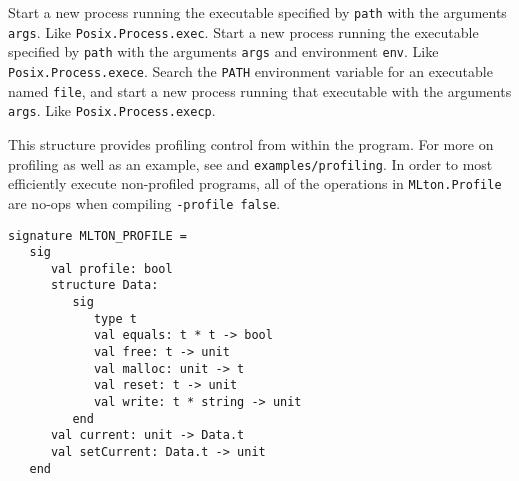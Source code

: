\begin{description}
Start a new process running the executable specified by {\tt path} with the
arguments {\tt args}.  Like {\tt Posix.Process.exec}.
Start a new process running the executable specified by {\tt path} with the
arguments {\tt args} and environment {\tt env}.  Like {\tt Posix.Process.exece}.
Search the {\tt PATH} environment variable for an executable named {\tt file},
and start a new process running that executable with the arguments {\tt args}.
Like {\tt Posix.Process.execp}.
\end{description}

This structure provides profiling control from within the program.
For more on profiling as well as an example, see 
and {\tt examples/profiling}. In order to most efficiently execute
non-profiled programs, all of the operations in {\tt MLton.Profile}
are no-ops when compiling {\tt -profile false}.

\begin{verbatim}
signature MLTON_PROFILE =
   sig
      val profile: bool
      structure Data:
         sig
            type t
            val equals: t * t -> bool
            val free: t -> unit
            val malloc: unit -> t
            val reset: t -> unit
            val write: t * string -> unit
         end
      val current: unit -> Data.t
      val setCurrent: Data.t -> unit
   end
\end{verbatim}

